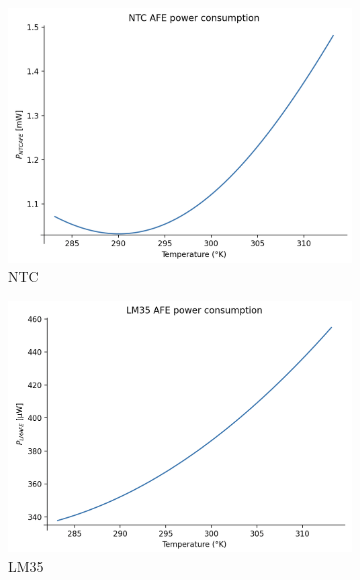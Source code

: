 \documentclass[12pt]{article}
\begin{document}
    \begin{figure}[h]
        \centering
        \begin{subfigure}{0.45\textwidth}
            \centering
            \includegraphics[width=\textwidth]{images/PowerNTC.png}
            \caption{ NTC }
        \end{subfigure}\hfill
        \begin{subfigure}{0.45\textwidth}
            \centering
            \includegraphics[width=\textwidth]{images/PowerLM.png}
            \caption{ LM35 }
        \end{subfigure}\
        \begin{subfigure}{0.45\textwidth}
            \centering

\end{subfigure}
\end{figure}
\end{document}
